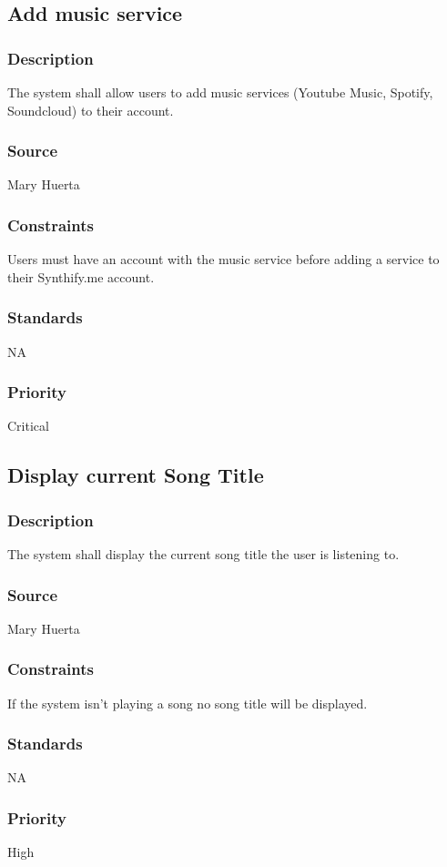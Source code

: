 \subsection{Add music service}
\subsubsection{Description}
The system shall allow users to add music services (Youtube Music, Spotify, Soundcloud) to their account.
\subsubsection{Source}
Mary Huerta
\subsubsection{Constraints}
Users must have an account with the music service before adding a service to their Synthify.me account.
\subsubsection{Standards}
NA
\subsubsection{Priority}
Critical



\subsection{Display current Song Title}
\subsubsection{Description}
The system shall display the current song title the user is listening to.
\subsubsection{Source}
Mary Huerta
\subsubsection{Constraints}
If the system isn't playing a song no song title will be displayed. 
\subsubsection{Standards}
NA
\subsubsection{Priority}
High



